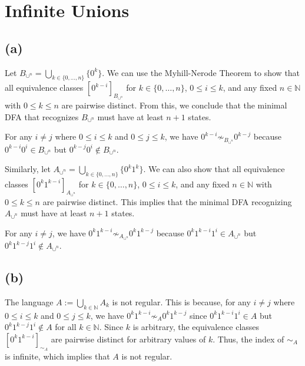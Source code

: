 




\setcounter{section}{3} %
\renewcommand{\thesection}{\arabic{section}} %

\section{Infinite Unions}

\subsection{(a)}
Let \( B_{\cup^n} = \bigcup_{k \in \{0, \dots, n\}} \{0^k\} \). We can use the Myhill-Nerode Theorem to show that all equivalence classes \( [0^{k-i}]_{B_{\cup^n}} \) for \( k \in \{0, \dots, n\} \), \( 0 \leq i \leq k \), and any fixed \( n \in \mathbb{N} \) with \( 0 \leq k \leq n \) are pairwise distinct. From this, we conclude that the minimal DFA that recognizes \( B_{\cup^n} \) must have at least \( n + 1 \) states.

For any \( i \neq j \) where \( 0 \leq i \leq k \) and \( 0 \leq j \leq k \), we have \( 0^{k-i} \not\sim_{B_{\cup^n}} 0^{k-j} \) because \( 0^{k-i} 0^i \in B_{\cup^n} \) but \( 0^{k-j} 0^i \notin B_{\cup^n} \).

Similarly, let \( A_{\cup^n} = \bigcup_{k \in \{0, \dots, n\}} \{0^k 1^k\} \). We can also show that all equivalence classes \( [0^k 1^{k-i}]_{A_{\cup^n}} \) for \( k \in \{0, \dots, n\} \), \( 0 \leq i \leq k \), and any fixed \( n \in \mathbb{N} \) with \( 0 \leq k \leq n \) are pairwise distinct. This implies that the minimal DFA recognizing \( A_{\cup^n} \) must have at least \( n + 1 \) states.

For any \( i \neq j \), we have \( 0^k 1^{k-i} \not\sim_{A_{\cup^n}} 0^k 1^{k-j} \) because \( 0^k 1^{k-i} 1^i \in A_{\cup^n} \) but \( 0^k 1^{k-j} 1^i \notin A_{\cup^n} \).

\subsection{(b)}
The language \( A := \bigcup_{k \in \mathbb{N}} A_k \) is not regular. This is because, for any \( i \neq j \) where \( 0 \leq i \leq k \) and \( 0 \leq j \leq k \), we have \( 0^k 1^{k-i} \not\sim_{A} 0^k 1^{k-j} \) since \( 0^k 1^{k-i} 1^i \in A \) but \( 0^k 1^{k-j} 1^i \notin A \) for all \( k \in \mathbb{N} \). Since \( k \) is arbitrary, the equivalence classes \( [0^k 1^{k-i}]_{\sim_{A}} \) are pairwise distinct for arbitrary values of \( k \). Thus, the index of \( \sim_{A} \) is infinite, which implies that \( A \) is not regular.

